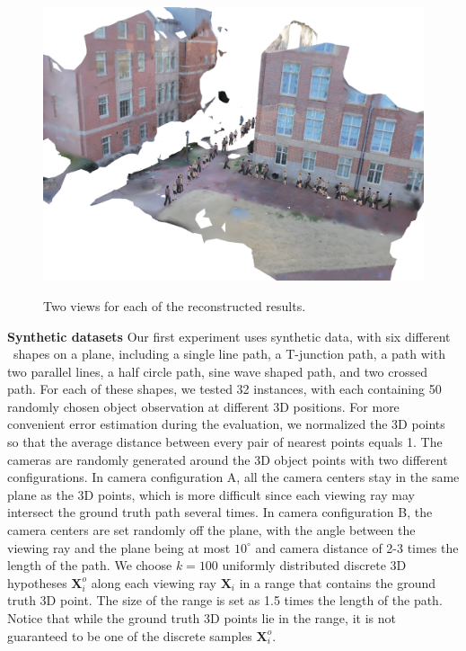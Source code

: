 \begin{figure}[t]
{    \includegraphics[height=0.18\textheight]{chapter4/resource/tjunction2.PNG}
}
\caption{Two views for each of the reconstructed results.}
\label{fig:reconstructed}
\end{figure}

\textbf{Synthetic datasets} Our first experiment uses synthetic data, with six different \oct~shapes on a plane, including a single line path, a T-junction path, a path with two parallel lines, a half circle path, sine wave shaped path, and two crossed path. For each of these shapes, we tested 32 instances, with each containing 50 randomly chosen object observation at different 3D positions. For more convenient error estimation during the evaluation, we normalized the 3D points so that the average distance between every pair of nearest points equals 1. The cameras are randomly generated around the 3D object points with two different configurations. In camera configuration A, all the camera centers stay in the same plane as the 3D points, which is more difficult since each viewing ray may intersect the ground truth path several times. In camera configuration B, the camera centers are set randomly off the plane, with the angle between the viewing ray and the plane being at most $10^\circ$ and camera distance of 2-3 times the length of the path. We choose $k=100$ uniformly distributed discrete 3D hypotheses $\mathbf{X}_i^o$  along each viewing ray $\mathbf{X}_i$ in a range that contains the ground truth 3D point. The size of the range is set as 1.5 times the length of the path. Notice that while the ground truth 3D points lie in the range, it is not guaranteed to be one of the discrete samples $\mathbf{X}_i^o$. %

